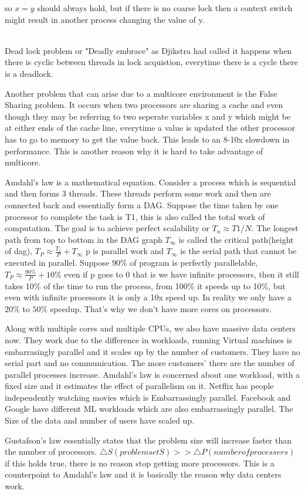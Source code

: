 \documentclass[twoside]{article}
\begin{document}
so $x=y$ should always hold, but if there is no coarse lock then a context switch might result in another process changing the value of y. 

\\

Dead lock problem or "Deadly embrace" as Djikstra had called it happens when there is cyclic
between threads in lock acquistion, everytime there is a cycle there is a deadlock. 

Another problem that can arise due to a multicore environment is the False Sharing problem. It occurs when two processors are sharing a cache and even though they may be referring to two seperate variables x and y which might be at either ends of the cache line, everytime a value is updated the other processor has to go to memory to get the value back. This leads to an 8-10x slowdown in performance. This is another reason why it is hard to take advantage of multicore. 

Amdahl's law is a mathematical equation. Consider a process which is sequential and then forms 3 threads. These threads perform some work and then are connected back and essentially form a DAG. Suppose the time taken by one processor to complete the task is T1, this is also called the total work of computation. The goal is to achieve perfect scalability or $T_n \approx T1/N$. The longest path from top to bottom in the DAG graph $T_\infty$ is called the critical path(height of dag), $T_P \approx \frac{T_1}{P}+T_\infty$ p is parallel work and $T_\infty$ is the serial path that cannot be executed in parallel. Suppose $90\%$ of program is perfectly parallelable, $T_P \approx \frac{90\%}{P}+10\%$ even if p goes to 0 that is we have infinite processors, then it still takes 10\% of the time to run the process, from 100\% it speeds up to 10\%, but even with infinite processors it is only a 10x speed up. In reality we only have a $20\%$ to $50\%$ speedup. That's why we don't have more cores on processors. 

Along with multiple cores and multiple CPUs, we also have massive data centers now. They work due to the difference in workloads, running Virtual machines is embarrasingly parallel and it scales up by the number of customers. They have no serial part and no communication. The more customers' there are the number of parallel processes increase. Amdahl's law is concerned about one workload, with a fixed size and it estimates the effect of parallelism on it. Netflix has people independently watching movies which is Embarrassingly parallel. Facebook and Google have different ML workloads which are also embarrassingly parallel. The Size of the data and number of users have scaled up. 

Gustafson's law essentially states that the problem size will increase faster than the number of processors. $\bigtriangleup S (problem set S)>> \bigtriangleup P(number of processers)$ if this holds true, there is no reason stop getting more processors. This is a counterpoint to Amdahl's law and it is basically the reason why data centers work.
\end{document}
